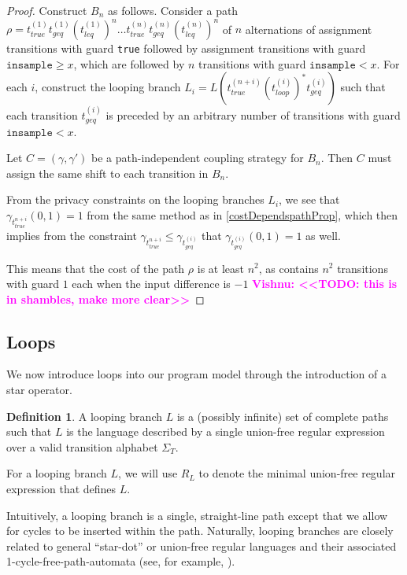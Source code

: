 \documentclass[12pt]{article}
\newcommand{\gguard}[1][x]{\texttt{insample}\geq#1}
\newcommand{\lguard}[1][x]{\texttt{insample} < #1}
\newcommand{\todo}[2]{\textcolor{#1}{\textbf{#2}}}
\newcommand{\vishnu}[1]{\todo{magenta}{Vishnu: <<#1>>}}
\theoremstyle{definition}
\newtheorem{defn}[thm]{Definition}
\begin{document}
\begin{proof}
    Construct $B_n$ as follows. Consider a path $\rho = t_{true}^{(1)} t_{geq}^{(1)} \left(t_{leq}^{(1)}\right)^n \dots t_{true}^{(n)} t_{geq}^{(n)} \left(t_{leq}^{(n)}\right)^n$ of $n$ alternations of assignment transitions with guard \texttt{true} followed by assignment transitions with guard $\gguard$, which are followed by $n$ transitions with guard $\lguard$. 
    For each $i$, construct the looping branch $L_i = L\left(t_{true}^{(n + i)} \left(t_{loop}^{(i)}\right)^* t_{geq}^{(i)}\right)$ such that each transition $t_{geq}^{(i)}$ is preceded by an arbitrary number of transitions with guard $\lguard$.
    
    Let $C = (\gamma, \gamma')$ be a path-independent coupling strategy for $B_n$. Then $C$ must assign the same shift to each transition in $B_n$. 

    From the privacy constraints on the looping branches $L_i$, we see that $\gamma_{t_{true}^{n + i}}(0, 1) = 1$ from the same method as in \ref{costDependspathProp}, which then implies from the constraint $\gamma_{t_{true}^{n + i}} \leq \gamma_{t_{geq}^{(i)}}$ that $\gamma_{t_{geq}^{(i)}}(0, 1) = 1$ as well.

    This means that the cost of the path $\rho$ is at least $n^2$, as contains $n^2$ transitions with guard $1$ each when the input difference is $-1$ \vishnu{TODO: this is in shambles, make more clear}
\end{proof}


\subsection{Loops}

We now introduce loops into our program model through the introduction of a star operator. 

\begin{defn}
    A looping branch $L$ is a (possibly infinite) set of complete paths such that $L$ is the language described by a single union-free regular expression over a valid transition alphabet $\Sigma_T$.
\end{defn}

For a looping branch $L$, we will use $R_L$ to denote the minimal union-free regular expression that defines $L$. 

Intuitively, a looping branch is a single, straight-line path except that we allow for cycles to be inserted within the path. Naturally, looping branches are closely related to general ``star-dot'' or union-free regular languages and their associated 1-cycle-free-path-automata (see, for example, \cite{nagy2006union}).
\end{document}
